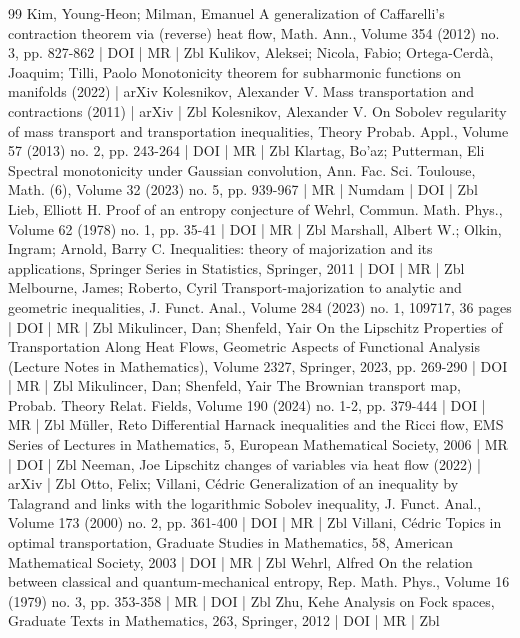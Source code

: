 \begin{thebibliography}{99}
 Kim, Young-Heon; Milman, Emanuel A generalization of Caffarelli’s contraction theorem via (reverse) heat flow, Math. Ann., Volume 354 (2012) no. 3, pp. 827-862 | DOI | MR | Zbl
 Kulikov, Aleksei; Nicola, Fabio; Ortega-Cerdà, Joaquim; Tilli, Paolo Monotonicity theorem for subharmonic functions on manifolds (2022) | arXiv
 Kolesnikov, Alexander V. Mass transportation and contractions (2011) | arXiv | Zbl
 Kolesnikov, Alexander V. On Sobolev regularity of mass transport and transportation inequalities, Theory Probab. Appl., Volume 57 (2013) no. 2, pp. 243-264 | DOI | MR | Zbl
 Klartag, Bo’az; Putterman, Eli Spectral monotonicity under Gaussian convolution, Ann. Fac. Sci. Toulouse, Math. (6), Volume 32 (2023) no. 5, pp. 939-967 | MR | Numdam | DOI | Zbl
 Lieb, Elliott H. Proof of an entropy conjecture of Wehrl, Commun. Math. Phys., Volume 62 (1978) no. 1, pp. 35-41 | DOI | MR | Zbl
 Marshall, Albert W.; Olkin, Ingram; Arnold, Barry C. Inequalities: theory of majorization and its applications, Springer Series in Statistics, Springer, 2011 | DOI | MR | Zbl
 Melbourne, James; Roberto, Cyril Transport-majorization to analytic and geometric inequalities, J. Funct. Anal., Volume 284 (2023) no. 1, 109717, 36 pages | DOI | MR | Zbl
 Mikulincer, Dan; Shenfeld, Yair On the Lipschitz Properties of Transportation Along Heat Flows, Geometric Aspects of Functional Analysis (Lecture Notes in Mathematics), Volume 2327, Springer, 2023, pp. 269-290 | DOI | MR | Zbl
 Mikulincer, Dan; Shenfeld, Yair The Brownian transport map, Probab. Theory Relat. Fields, Volume 190 (2024) no. 1-2, pp. 379-444 | DOI | MR | Zbl
 Müller, Reto Differential Harnack inequalities and the Ricci flow, EMS Series of Lectures in Mathematics, 5, European Mathematical Society, 2006 | MR | DOI | Zbl
 Neeman, Joe Lipschitz changes of variables via heat flow (2022) | arXiv | Zbl
 Otto, Felix; Villani, Cédric Generalization of an inequality by Talagrand and links with the logarithmic Sobolev inequality, J. Funct. Anal., Volume 173 (2000) no. 2, pp. 361-400 | DOI | MR | Zbl
 Villani, Cédric Topics in optimal transportation, Graduate Studies in Mathematics, 58, American Mathematical Society, 2003 | DOI | MR | Zbl
 Wehrl, Alfred On the relation between classical and quantum-mechanical entropy, Rep. Math. Phys., Volume 16 (1979) no. 3, pp. 353-358 | MR | DOI | Zbl
 Zhu, Kehe Analysis on Fock spaces, Graduate Texts in Mathematics, 263, Springer, 2012 | DOI | MR | Zbl
\end{thebibliography}
